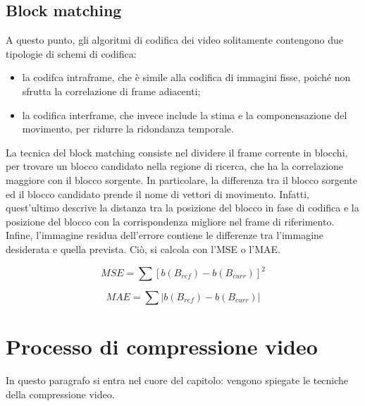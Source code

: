 \subsection{Block matching}
A questo punto, gli algoritmi di codifica dei video solitamente contengono due tipologie di schemi di codifica:
\begin{itemize}
    \item la codifca intraframe, che è simile alla codifica di immagini fisse, poiché non sfrutta la correlazione di frame adiacenti;
    \item la codifica interframe, che invece include la stima e la componensazione del movimento, per ridurre la ridondanza temporale.
\end{itemize}
La tecnica del block matching consiste nel dividere il frame corrente in blocchi, per trovare un blocco candidato nella regione di ricerca, che ha la
correlazione maggiore con il blocco sorgente. In particolare, la differenza tra il blocco sorgente ed il blocco candidato prende il nome di vettori di
movimento. Infatti, quest'ultimo descrive la distanza tra la posizione del blocco in fase di codifica e la posizione del blocco con la corrispondenza 
migliore nel frame di riferimento. Infine, l'immagine residua dell'errore contiene le differenze tra l'immagine desiderata e quella prevista. Ciò, si
calcola con l'MSE o l'MAE.
\begin{center}
\begin{minipage}{0.48\textwidth} %
    \centering
        \begin{equation*}
            MSE = \sum\left[ b\left(B_{ref}\right) - b\left(B_{curr}\right) \right]^2
        \end{equation*}     
\end{minipage}
\hfill %
\begin{minipage}{0.48\textwidth} %
    \begin{equation*}
            MAE = \sum\left| b\left(B_{ref}\right) - b\left(B_{curr}\right)\right|
    \end{equation*}
\end{minipage}
\end{center}
\section{Processo di compressione video}
In questo paragrafo si entra nel cuore del capitolo: vengono spiegate le tecniche della compressione video.
